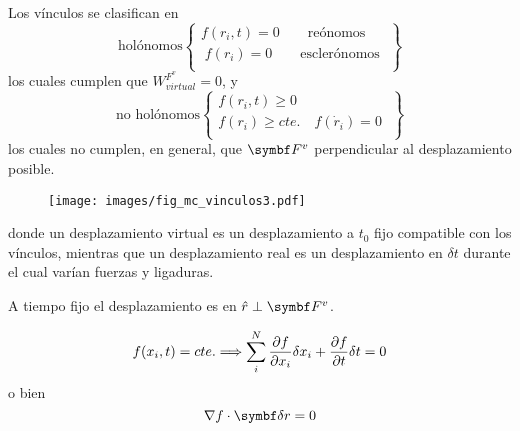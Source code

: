 \documentclass[10pt,oneside]{CBFT_book}
\begin{document}
Los vínculos se clasifican en
\[
\textrm{holónomos} 
\begin{Bmatrix}
 f(r_i,t) = 0 \qquad \textrm{reónomos} \\
\; f(r_i) = 0 \qquad \textrm{esclerónomos} \;\\
\end{Bmatrix} 
\]
los cuales cumplen que  $W_{virtual}^{F^v}=0$, y
\[
\textrm{no holónomos} 
\begin{Bmatrix}
 f(r_i,t) \geq 0  \\
 f(r_i) \geq cte. \quad f(\dot{r}_i) = 0  \; \\
\end{Bmatrix}
\]
los cuales no cumplen, en general, que $\vb{F}^v$ perpendicular al desplazamiento posible.
\begin{figure}[hbt]
	\begin{center}
	\texttt{[image: images/fig\_mc\_vinculos3.pdf]}	
	\end{center}
	\caption{}
\end{figure} 
donde un desplazamiento virtual es un desplazamiento a $t_0$ fijo compatible con los vínculos,
mientras que un desplazamiento real es un desplazamiento en $\delta t$ durante el cual varían
fuerzas y ligaduras.

A tiempo fijo el desplazamiento es en $\hat{r} \perp \vb{F}^v$.

\[
	f(x_i,t) = cte. \Longrightarrow \sum_i^N \frac{\partial^{\hspace{-0.05em}} {f}}{\partial {x_i}^{\hspace{-0.05em}}} \delta x_i + \frac{\partial^{\hspace{-0.05em}} {f}}{\partial {t}^{\hspace{-0.05em}}} \delta t = 0 
\]
o bien
\[
	\nabla f \cdot \vb{\delta r} = 0
\]


\end{document}
